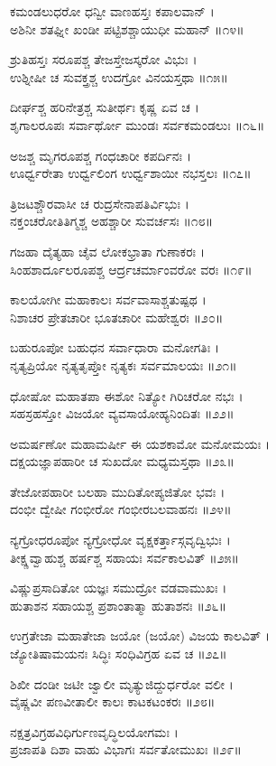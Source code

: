 ಕಮಂಡಲುಧರೋ ಧನ್ವೀ ವಾಣಹಸ್ತಃ ಕಪಾಲವಾನ್ ।\\
ಅಶಿನೀ ಶತಘ್ನೀ ಖಂಡೀ ಪಟ್ಟಿಶಶ್ಚಾಯುಧೀ ಮಹಾನ್ ॥೧೪॥

ಶ್ರುತಿಹಸ್ತಃ ಸರೂಪಶ್ಚ ತೇಜಸ್ತೇಜಸ್ಕರೋ ವಿಭುಃ ।\\
ಉಶ್ನೀಷೀ ಚ ಸುವಕ್ತ್ರಶ್ಚ ಉದಗ್ರೋ ವಿನಯಸ್ತಥಾ ॥೧೫॥

ದೀರ್ಘಶ್ಚ ಹರಿನೇತ್ರಶ್ಚ ಸುತೀರ್ಥಃ ಕೃಷ್ಣ ಏವ ಚ ।\\
ಶೃಗಾಲರೂಪಃ ಸರ್ವಾರ್ಥೋ ಮುಂಡಃ ಸರ್ವಕಮಂಡಲುಃ ॥೧೬॥

ಅಜಶ್ಚ ಮೃಗರೂಪಶ್ಚ ಗಂಧಚಾರೀ ಕಪರ್ದಿನಃ ।\\
ಊರ್ಧ್ವರೇತಾ ಉರ್ಧ್ವಲಿಂಗ ಉರ್ಧ್ವಶಾಯೀ ನಭಸ್ತಲಃ ॥೧೭॥

ತ್ರಿಜಟಶ್ಚೌರವಾಸೀ ಚ ರುದ್ರಸೇನಾಪತಿರ್ವಿಭುಃ ।\\
ನಕ್ತಂಚರೋತಿತಿಗ್ಮಶ್ಚ ಅಹಶ್ಚಾರೀ ಸುವರ್ಚಸಃ ॥೧೮॥

ಗಜಹಾ ದೈತ್ಯಹಾ ಚೈವ ಲೋಕಭ್ರಾತಾ ಗುಣಾಕರಃ ।\\
ಸಿಂಹಶಾರ್ದೂಲರೂಪಶ್ಚ ಆರ್ದ್ರಚರ್ಮಾಂವರೋ ವರಃ ॥೧೯॥

ಕಾಲಯೋಗೀ ಮಹಾಕಾಲಃ ಸರ್ವವಾಸಾಶ್ಚತುಷ್ಪಥ ।\\
ನಿಶಾಚರ ಪ್ರೇತಚಾರೀ ಭೂತಚಾರೀ ಮಹೇಶ್ವರಃ ॥೨೦॥

ಬಹುರೂಪೋ ಬಹುಧನ ಸರ್ವಾಧಾರಾ ಮನೋಗತಿಃ ।\\
ನೃತ್ಯಪ್ರಿಯೋ ನೃತ್ಯತೃಪ್ತೋ ನೃತ್ಯಕಃ ಸರ್ವಮಾಲಯಃ ॥೨೧॥

ಧೋಷೋ ಮಹಾತಪಾ ಈಶೋ ನಿತ್ಯೋ ಗಿರಿಚರೋ ನಭಃ ।\\
ಸಹಸ್ರಹಸ್ತೋ ವಿಜಯೋ ವ್ಯವಸಾಯೋಹ್ಯನಿಂದಿತಃ ॥೨೨॥

ಅಮರ್ಷಣೋ ಮಹಾಮರ್ಷೀ ಈ ಯಶಕಾಮೋ ಮನೋಮಯಃ ।\\
ದಕ್ಷಯಜ್ಞಾಪಹಾರೀ ಚ ಸುಖದೋ ಮಧ್ಯಮಸ್ತಥಾ ॥೨೩॥

ತೇಜೋಪಹಾರೀ ಬಲಹಾ ಮುದಿತೋಪ್ಯಜಿತೋ ಭವಃ ।\\
ದಂಭೀ ದ್ವೇಷೀ ಗಂಭೀರೋ ಗಂಭೀರಬಲವಾಹನಃ ॥೨೪॥

ನ್ಯಗ್ರೋಧರೂಪೋ ನ್ಯಗ್ರೋಧೋ ವೃಕ್ಷಕರ್ತ್ತಾಸ್ಗವೃದ್ವಿಭುಃ ।\\
ತೀಕ್ಷ್ಣವ್ವಾಹುಶ್ಚ ಹರ್ಷಶ್ಚ ಸಹಾಯಃ ಸರ್ವಕಾಲವಿತ್ ॥೨೫॥

ವಿಷ್ಣುಪ್ರಸಾದಿತೋ ಯಜ್ಞಃ ಸಮುದ್ರೋ ವಡವಾಮುಖಃ ।\\
ಹುತಾಶನ ಸಹಾಯಶ್ಚ ಪ್ರಶಾಂತಾತ್ಮಾ ಹುತಾಶನಃ ॥೨೬॥

ಉಗ್ರತೇಜಾ ಮಹಾತೇಜಾ ಜಯೋ (ಜಯೋ) ವಿಜಯ ಕಾಲವಿತ್ ।\\
ಜ್ಯೋತಿಷಾಮಯನಃ ಸಿದ್ಧಿಃ ಸಂಧಿವಿಗ್ರಹ ಏವ ಚ ॥೨೭॥

ಶಿಖೀ ದಂಡೀ ಜಟೀ ಜ್ವಾಲೀ ಮೃತ್ಯುಜಿದ್ದುರ್ಧರೋ ವಲೀ ।\\
ವೈಷ್ಣವೀ ಪಣವೀತಾಲೀ ಕಾಲಃ ಕಾಟಕಟಂಕರಃ ॥೨೮॥

ನಕ್ಷತ್ರವಿಗ್ರಹವಿಧಿರ್ಗುಣವೃದ್ಧಿಲಯೋಗಮಃ ।\\
ಪ್ರಜಾಪತಿ ದಿಶಾ ವಾಹು ವಿಭಾಗಃ ಸರ್ವತೋಮುಖಃ ॥೨೯॥

